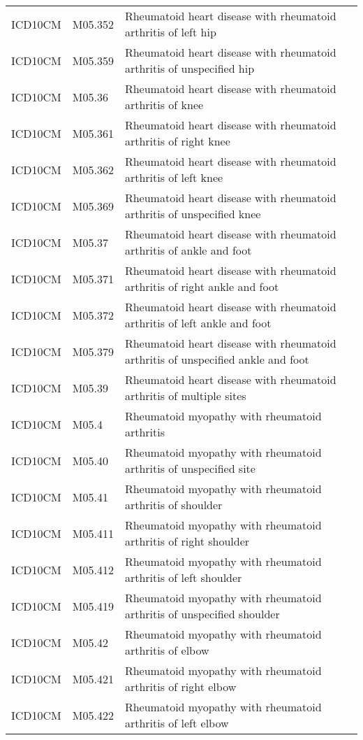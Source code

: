 \begin{longtable}{p{}p{}p{}}
  ICD10CM & M05.352 & Rheumatoid heart disease with rheumatoid arthritis of left hip \\ 
  ICD10CM & M05.359 & Rheumatoid heart disease with rheumatoid arthritis of unspecified hip \\ 
  ICD10CM & M05.36 & Rheumatoid heart disease with rheumatoid arthritis of knee \\ 
  ICD10CM & M05.361 & Rheumatoid heart disease with rheumatoid arthritis of right knee \\ 
  ICD10CM & M05.362 & Rheumatoid heart disease with rheumatoid arthritis of left knee \\ 
  ICD10CM & M05.369 & Rheumatoid heart disease with rheumatoid arthritis of unspecified knee \\ 
  ICD10CM & M05.37 & Rheumatoid heart disease with rheumatoid arthritis of ankle and foot \\ 
  ICD10CM & M05.371 & Rheumatoid heart disease with rheumatoid arthritis of right ankle and foot \\ 
  ICD10CM & M05.372 & Rheumatoid heart disease with rheumatoid arthritis of left ankle and foot \\ 
  ICD10CM & M05.379 & Rheumatoid heart disease with rheumatoid arthritis of unspecified ankle and foot \\ 
  ICD10CM & M05.39 & Rheumatoid heart disease with rheumatoid arthritis of multiple sites \\ 
  ICD10CM & M05.4 & Rheumatoid myopathy with rheumatoid arthritis \\ 
  ICD10CM & M05.40 & Rheumatoid myopathy with rheumatoid arthritis of unspecified site \\ 
  ICD10CM & M05.41 & Rheumatoid myopathy with rheumatoid arthritis of shoulder \\ 
  ICD10CM & M05.411 & Rheumatoid myopathy with rheumatoid arthritis of right shoulder \\ 
  ICD10CM & M05.412 & Rheumatoid myopathy with rheumatoid arthritis of left shoulder \\ 
  ICD10CM & M05.419 & Rheumatoid myopathy with rheumatoid arthritis of unspecified shoulder \\ 
  ICD10CM & M05.42 & Rheumatoid myopathy with rheumatoid arthritis of elbow \\ 
  ICD10CM & M05.421 & Rheumatoid myopathy with rheumatoid arthritis of right elbow \\ 
  ICD10CM & M05.422 & Rheumatoid myopathy with rheumatoid arthritis of left elbow \\ 

\end{longtable}
